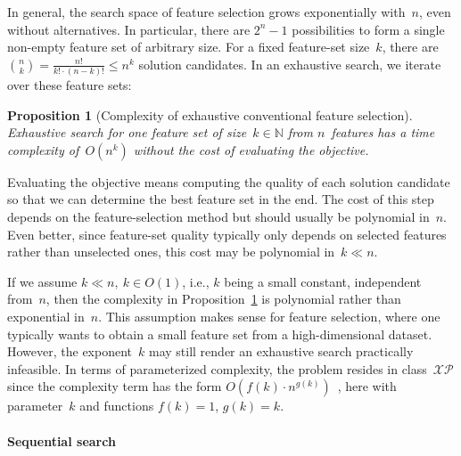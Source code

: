 \documentclass{article}
\newtheorem{proposition}{Proposition}
\theoremstyle{definition}
\begin{document}
In general, the search space of feature selection grows exponentially with~$n$, even without alternatives.
In particular, there are $2^n - 1$ possibilities to form a single non-empty feature set of arbitrary size.
For a fixed feature-set size~$k$, there are $\binom{n}{k} = \frac{n!}{k! \cdot (n-k)!} \leq n^k$ solution candidates.
In an exhaustive search, we iterate over these feature sets:
%
\begin{proposition}[Complexity of exhaustive conventional feature selection]
	Exhaustive search for one feature set of size~$k \in \mathbb{N}$ from $n$~features has a time complexity of~$O(n^k)$ without the cost of evaluating the objective.
	\label{prop:afs:complexity-exhaustive-conventional}
\end{proposition}
%
Evaluating the objective means computing the quality of each solution candidate so that we can determine the best feature set in the end.
The cost of this step depends on the feature-selection method but should usually be polynomial in~$n$.
Even better, since feature-set quality typically only depends on selected features rather than unselected ones, this cost may be polynomial in~$k \ll n$.

If we assume $k \ll n,~k \in O(1)$, i.e., $k$ being a small constant, independent from~$n$, then the complexity in Proposition~\ref{prop:afs:complexity-exhaustive-conventional} is polynomial rather than exponential in~$n$.
This assumption makes sense for feature selection, where one typically wants to obtain a small feature set from a high-dimensional dataset.
However, the exponent~$k$ may still render an exhaustive search practically infeasible.
In terms of parameterized complexity, the problem resides in class~$\mathcal{XP}$ since the complexity term has the form $O(f(k) \cdot n^{g(k)})$~\cite{downey1997parameterized}, here with parameter~$k$ and functions $f(k) = 1$, $g(k) = k$.

\paragraph{Sequential search}
\end{document}
